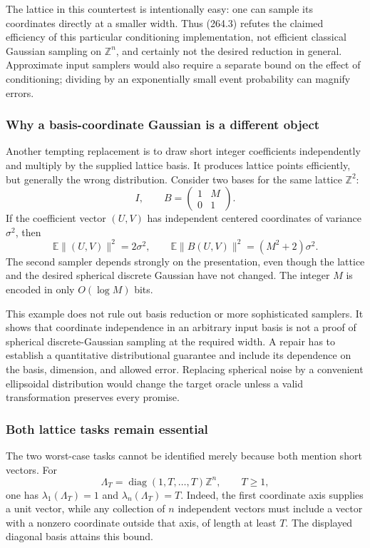 \documentclass[11pt]{article}
\begin{document}
The lattice in this countertest is intentionally easy: one can sample its coordinates directly at a smaller width. Thus (264.3) refutes the claimed efficiency of this particular conditioning implementation, not efficient classical Gaussian sampling on $\mathbb Z^n$, and certainly not the desired reduction in general. Approximate input samplers would also require a separate bound on the effect of conditioning; dividing by an exponentially small event probability can magnify errors.

\subsubsection{Why a basis-coordinate Gaussian is a different object}
Another tempting replacement is to draw short integer coefficients independently and multiply by the supplied lattice basis. It produces lattice points efficiently, but generally the wrong distribution. Consider two bases for the same lattice $\mathbb Z^2$:
\[
 I,\qquad B=\begin{pmatrix}1&M\\0&1\end{pmatrix}.
\]
If the coefficient vector $(U,V)$ has independent centered coordinates of variance $\sigma^2$, then
\[
 \mathbb E\|(U,V)\|^2=2\sigma^2,\qquad
 \mathbb E\|B(U,V)\|^2=(M^2+2)\sigma^2.
 \tag{264.4}
\]
The second sampler depends strongly on the presentation, even though the lattice and the desired spherical discrete Gaussian have not changed. The integer $M$ is encoded in only $O(\log M)$ bits.

This example does not rule out basis reduction or more sophisticated samplers. It shows that coordinate independence in an arbitrary input basis is not a proof of spherical discrete-Gaussian sampling at the required width. A repair has to establish a quantitative distributional guarantee and include its dependence on the basis, dimension, and allowed error. Replacing spherical noise by a convenient ellipsoidal distribution would change the target oracle unless a valid transformation preserves every promise.

\subsubsection{Both lattice tasks remain essential}
The two worst-case tasks cannot be identified merely because both mention short vectors. For
\[
 \Lambda_T=\operatorname{diag}(1,T,\ldots,T)\mathbb Z^n,\qquad T\ge1,
\]
one has $\lambda_1(\Lambda_T)=1$ and $\lambda_n(\Lambda_T)=T$. Indeed, the first coordinate axis supplies a unit vector, while any collection of $n$ independent vectors must include a vector with a nonzero coordinate outside that axis, of length at least $T$. The displayed diagonal basis attains this bound.
\end{document}
